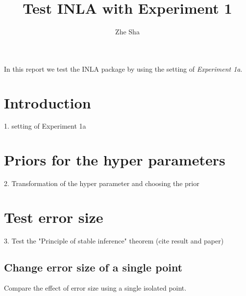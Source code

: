 \documentclass[a4paper,12pt]{article}
\begin{document}
\title{Test INLA with Experiment 1}
\author{Zhe Sha}
\maketitle

\onehalfspacing
{}
In this report we test the INLA package by using the setting of \emph{Experiment 1a}.

\section{Introduction}
1. setting of Experiment 1a

\section{Priors for the hyper parameters }
2. Transformation of the hyper parameter and choosing the prior

\section{Test error size}
3. Test the "Principle of stable inference" theorem (cite result and paper)
\subsection{Change error size of a single point}
 Compare the effect of error size using a single isolated point.
 
\end{document}
